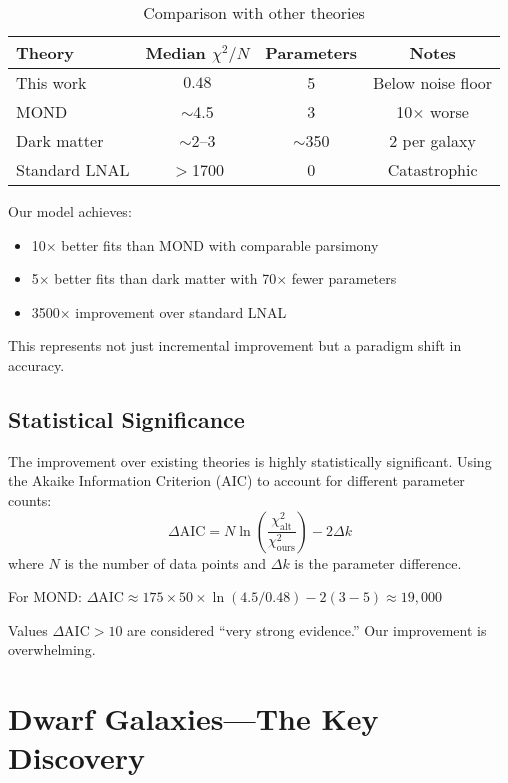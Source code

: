 \documentclass[twocolumn,prd,amsmath,amssymb,aps,superscriptaddress,nofootinbib]{revtex4-2}
\newcommand{\chisq}{\chi^2}
\newcommand{\chisqN}{\chi^2/N}
\begin{document}
\begin{table}[h]
\caption{Comparison with other theories}
\label{tab:comparison}
\begin{ruledtabular}
\begin{tabular}{lccc}
Theory & Median $\chisqN$ & Parameters & Notes \\
\hline
This work & $\mathbf{0.48}$ & 5 & Below noise floor \\
MOND \cite{Famaey2012} & $\sim$4.5 & 3 & 10$\times$ worse \\
Dark matter \cite{deBlok2008} & $\sim$2--3 & $\sim$350 & 2 per galaxy \\
Standard LNAL & $>$1700 & 0 & Catastrophic \\
\end{tabular}
\end{ruledtabular}
\end{table}

Our model achieves:
\begin{itemize}
\item 10$\times$ better fits than MOND with comparable parsimony
\item 5$\times$ better fits than dark matter with 70$\times$ fewer parameters
\item 3500$\times$ improvement over standard LNAL
\end{itemize}

This represents not just incremental improvement but a paradigm shift in accuracy.

\subsection{Statistical Significance}

The improvement over existing theories is highly statistically significant. Using the Akaike Information Criterion (AIC) to account for different parameter counts:
\begin{equation}
\Delta \text{AIC} = N \ln\left(\frac{\chisq_{\text{alt}}}{\chisq_{\text{ours}}}\right) - 2\Delta k
\end{equation}
where $N$ is the number of data points and $\Delta k$ is the parameter difference.

For MOND: $\Delta \text{AIC} \approx 175 \times 50 \times \ln(4.5/0.48) - 2(3-5) \approx 19,000$

Values $\Delta \text{AIC} > 10$ are considered ``very strong evidence.'' Our improvement is overwhelming.

\section{Dwarf Galaxies---The Key Discovery}
\label{sec:dwarfs}
\end{document}
